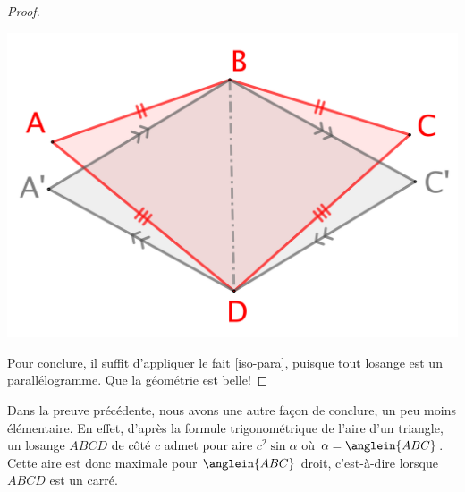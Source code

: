 \begin{proof}
	\begin{center}
		\includegraphics[scale=.4]{content/quadrilateral/gene/convex-isopaire.png}
	\end{center}
	
	
	Pour conclure, il suffit d'appliquer le fait \ref{iso-para}, puisque tout losange est un parallélogramme. Que la géométrie est belle!
\end{proof}




\begin{remark}
	Dans la preuve précédente, nous avons une autre façon de conclure, un peu moins élémentaire.
	En effet, d'après la formule trigonométrique de l'aire d'un triangle,
	un losange $ABCD$ de côté $c$ admet pour aire $c^2 \sin \alpha$ où $\alpha = \anglein{ABC}$.
	Cette aire est donc maximale pour $\anglein{ABC}$ droit, c'est-à-dire lorsque $ABCD$ est un carré.
\end{remark}
